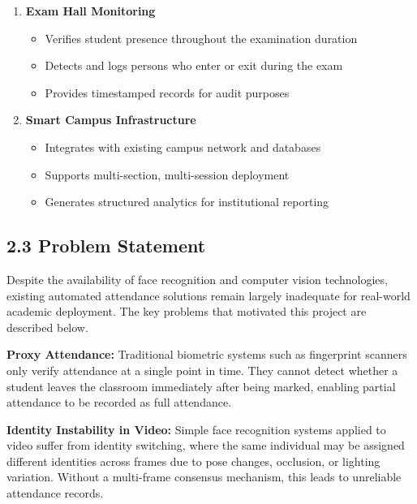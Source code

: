 \documentclass{report}
\begin{document}
\begin{enumerate}
\item \textbf{Exam Hall Monitoring}
\begin{itemize}
    \item Verifies student presence throughout the examination duration
    \item Detects and logs persons who enter or exit during the exam
    \item Provides timestamped records for audit purposes
\end{itemize}

\item \textbf{Smart Campus Infrastructure}
\begin{itemize}
    \item Integrates with existing campus network and databases
    \item Supports multi-section, multi-session deployment
    \item Generates structured analytics for institutional reporting
\end{itemize}

\end{enumerate}

\subsection*{2.3 Problem Statement}
Despite the availability of face recognition and computer vision technologies, existing automated\vspace{3pt} attendance solutions remain largely inadequate for real-world academic deployment. The key problems\vspace{3pt} that motivated this project are described below.

\textbf{Proxy Attendance:} Traditional biometric systems such as fingerprint scanners only verify attendance\vspace{3pt} at a single point in time. They cannot detect whether a student leaves the classroom immediately\vspace{3pt} after being marked, enabling partial attendance to be recorded as full attendance.

\textbf{Identity Instability in Video:} Simple face recognition systems applied to video suffer from\vspace{3pt} identity switching, where the same individual may be assigned different identities across frames\vspace{3pt} due to pose changes, occlusion, or lighting variation. Without a multi-frame consensus mechanism,\vspace{3pt} this leads to unreliable attendance records.
\end{document}
